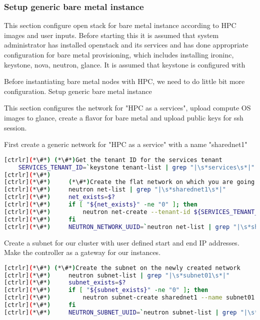 \subsubsection{Setup generic bare metal instance}

This section configure open stack for bare metal instance according to HPC images and user inputs. Before starting this it is assumed that system administrator has installed openstack and its services and has done appropriate configuration for bare metal provisioning, which includes installing ironinc, keystone, nova, neutron, glance. It is assumed that keystone is configured with 

Before instantiating bare metal nodes with HPC, we need to do little bit more configuration. 
Setup generic bare metal instance

This section configures the network for "HPC as a services", upload compute OS images to glance, create a flavor for bare metal and upload public keys for ssh session.

First create a generic network for "HPC as a service" with a name "sharednet1"

\begin{lstlisting}[language=bash,keywords={}]
[ctrlr](*\#*) (*\#*)Get the tenant ID for the services tenant
    SERVICES_TENANT_ID=`keystone tenant-list | grep "|\s*services\s*|" | awk '{print $2}'`
[ctrlr](*\#*) 
[ctrlr](*\#*)     (*\#*)Create the flat network on which you are going to launch instances
[ctrlr](*\#*)     neutron net-list | grep "|\s*sharednet1\s*|"
[ctrlr](*\#*)     net_exists=$?
[ctrlr](*\#*)     if [ "${net_exists}" -ne "0" ]; then
[ctrlr](*\#*)         neutron net-create --tenant-id ${SERVICES_TENANT_ID} sharednet1 --shared --provider:network_type flat --provider:physical_network physnet1
[ctrlr](*\#*)     fi
[ctrlr](*\#*)     NEUTRON_NETWORK_UUID=`neutron net-list | grep "|\s*sharednet1\s*|" | awk '{print $2}'`
\end{lstlisting}


Create a subnet for our cluster with user defined start and end IP addresses. Make the controller as a gateway for our instances.

\begin{lstlisting}[language=bash,keywords={}]
[ctrlr](*\#*) (*\#*)Create the subnet on the newly created network
[ctrlr](*\#*)     neutron subnet-list | grep "|\s*subnet01\s*|"
[ctrlr](*\#*)     subnet_exists=$?
[ctrlr](*\#*)     if [ "${subnet_exists}" -ne "0" ]; then
[ctrlr](*\#*)         neutron subnet-create sharednet1 --name subnet01 --ip-version=4 --gateway=${controller_ip} --allocation-pool start=${cc_subnet_dhcp_start},end=${cc_subnet_dhcp_end} --enable-dhcp ${cc_subnet_cidr}
[ctrlr](*\#*)     fi
[ctrlr](*\#*)     NEUTRON_SUBNET_UUID=`neutron subnet-list | grep "|\s*subnet01\s*|" | [ctrlr](*\#*) awk '{print $2}'`
\end{lstlisting}

